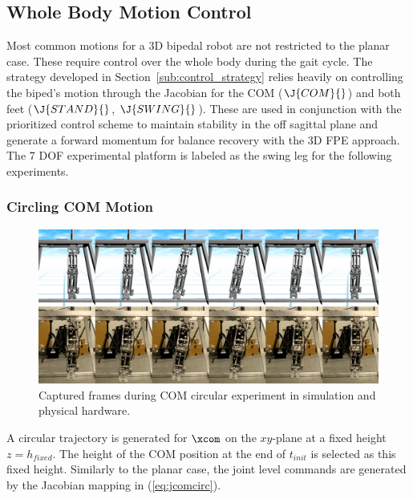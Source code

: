 
\subsection{Whole Body Motion Control} %
\label{sub:whole_body_motion_control}
Most common motions for a 3D bipedal robot are not restricted to the planar case. These require control over the whole body during the gait cycle. The strategy developed in Section~\ref{sub:control_strategy} relies heavily on controlling the biped's motion through the Jacobian for the COM ($\J{COM}{}$) and both feet ($\J{STAND}{}$, $\J{SWING}{}$). These are used in conjunction with the prioritized control scheme to maintain stability in the off sagittal plane and generate a forward momentum for balance recovery with the 3D FPE approach. The 7 DOF experimental platform is labeled as the swing leg for the following experiments.  

\subsubsection{Circling COM Motion} %
\label{ssub:com_circular_motion}

\begin{figure}[!b]
	\centering
    \includegraphics[scale=0.39]{fig/experiments/comcircleframes.png} 
  	\caption{Captured frames during COM circular experiment in simulation and physical hardware.}
	\label{fig:comcircleframes}
\end{figure}

A circular trajectory is generated for $\xcom$ on the $xy$-plane at a fixed height $z = h_{fixed}$. The height of the COM position at the end of $t_{init}$ is selected as this fixed height. Similarly to the planar case, the joint level commands are generated by the Jacobian mapping in (\ref{eq:jcomcirc}). 


